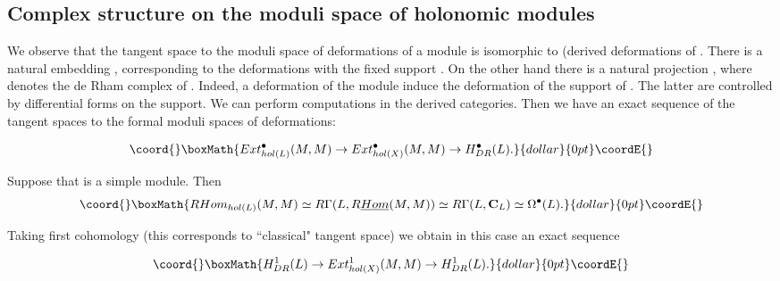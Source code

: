 \documentclass[a4paper,12pt]{article}
\begin{document}
\subsection{Complex structure on the moduli space of holonomic modules}

We observe that the tangent space to the moduli space of
deformations of a module \coordHE{} is isomorphic 
to \coordHE{} (derived deformations of \coordHE{}.
There is a natural embedding \coordHE{},
corresponding to the deformations with the fixed support \coordHE{}.
On the other hand there is a natural projection
\coordHE{}, where  \coordHE{}
denotes the de Rham complex of \coordHE{}. Indeed,
a deformation of the module \coordHE{}
induce the deformation of the support of \coordHE{}. The latter
are controlled by differential forms on the support.
We can perform computations in the derived categories.
Then we have an exact sequence of the tangent spaces
to the formal moduli spaces of deformations:

$$\coord{}\boxMath{ Ext^{\bullet}_{hol(L)}(M,M)\to Ext^{\bullet}_{hol(X)}(M,M)\to H^{\bullet}_{DR}(L).}{dollar}{0pt}\coordE{}$$

Suppose that \coordHE{} is a simple module. Then
$$\coord{}\boxMath{RHom_{hol(L)}(M,M)\simeq
R\Gamma(L,R\underline{Hom}(M,M))\simeq R\Gamma(L,{\C}_L)
\simeq \Omega^{\bullet}(L).}{dollar}{0pt}\coordE{}$$

Taking first cohomology (this corresponds to ``classical" tangent space)
we obtain in this case an exact sequence

$$\coord{}\boxMath{H^1_{DR}(L)\to Ext^1_{hol(X)}(M,M)\to H^1_{DR}(L).}{dollar}{0pt}\coordE{}$$
\end{document}
